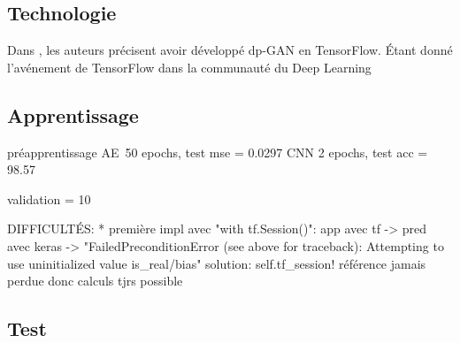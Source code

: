 \documentclass[a4paper,11pt,twocolumn,twoside]{article}
\theoremstyle{definition}
\newcommand{\DL}{Deep Learning}
\begin{document}
\subsection{Technologie}

Dans \cite{dpgan}, les auteurs précisent avoir développé dp-GAN en TensorFlow. Étant donné l'avénement de TensorFlow dans la communauté du \DL

\subsection{Apprentissage}

préapprentissage
	AE 50 epochs, test mse = 0.0297
	CNN 2 epochs, test acc = 98.57 %

validation = 10 %

DIFFICULTÉS:
* première impl avec "with tf.Session()": app avec tf -> pred avec keras -> "FailedPreconditionError (see above for traceback): Attempting to use uninitialized value is_real/bias"
	solution: self.tf_session! référence jamais perdue donc calculs tjrs possible

\subsection{Test}

\printbibliography[title=Références,heading=bibintoc]
\end{document}
